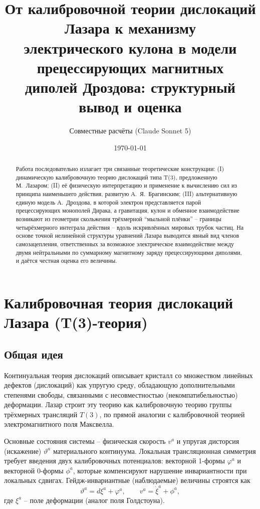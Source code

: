 \documentclass[12pt,a4paper]{article}
\title{От калибровочной теории дислокаций Лазара к механизму\\
электрического кулона в модели прецессирующих магнитных\\
диполей Дроздова: структурный вывод и оценка}
\author{Совместные расчёты (Claude Sonnet 5)}
\date{\today}
\begin{document}
\maketitle
\tableofcontents

\begin{abstract}
Работа последовательно излагает три связанные теоретические конструкции:
(I) динамическую калибровочную теорию дислокаций типа T(3), предложенную
М.~Лазаром; (II) её физическую интерпретацию и применение к вычислению
сил из принципа наименьшего действия, развитую А.~Я.~Брагинским;
(III) альтернативную единую модель А.~Дроздова, в которой электрон
представляется парой прецессирующих монополей Дирака, а гравитация,
кулон и обменное взаимодействие возникают из геометрии скольжения
трёхмерной ``мыльной плёнки'' -- границы четырёхмерного интеграла
действия -- вдоль искривлённых мировых трубок частиц. На основе точной
нелинейной структуры уравнений Лазара выводится явный вид членов
самозацепления, ответственных за возможное электрическое
взаимодействие между двумя нейтральными по суммарному магнитному
заряду прецессирующими диполями, и даётся честная оценка его величины.
\end{abstract}

\section{Калибровочная теория дислокаций Лазара (T(3)-теория)}

\subsection{Общая идея}

Континуальная теория дислокаций описывает кристалл со множеством
линейных дефектов (дислокаций) как упругую среду, обладающую
дополнительными степенями свободы, связанными с несовместностью
(некомпатибельностью) деформации. Лазар строит эту теорию как
калибровочную теорию группы трёхмерных трансляций $T(3)$, по прямой
аналогии с калибровочной теорией электромагнитного поля Максвелла.

Основные состояния системы -- физическая скорость $v^a$ и упругая
дисторсия (искажение) $\vartheta^a$ материального континуума. Локальная
трансляционная симметрия требует введения двух калибровочных
потенциалов: векторной 1-формы $\varphi^a$ и векторной 0-формы $\phi^a$,
которые компенсируют нарушение инвариантности при локальных сдвигах.
Гейдж-инвариантные (наблюдаемые) величины строятся как
\begin{equation}
\vartheta^a = d\xi^a+\varphi^a,\qquad v^a=\dot\xi^a+\phi^a,
\end{equation}
где $\xi^a$ -- поле деформации (аналог поля Голдстоуна).
\end{document}
